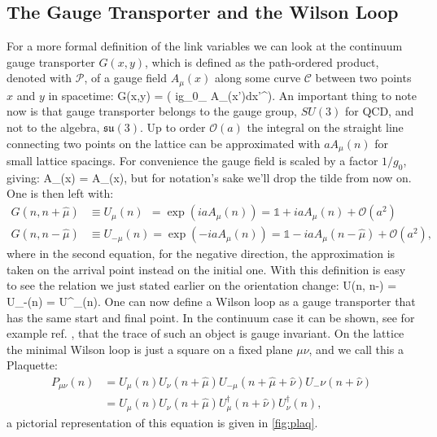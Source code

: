 \subsection{The Gauge Transporter and the Wilson Loop}
For a more formal definition of the link variables we can look at the continuum gauge transporter $G(x,y)$, which is defined as the path-ordered product, denoted with $\mathcal{P}$, of a gauge field $A_\mu(x)$ along some curve $\mathcal{C}$ between two points $x$ and $y$ in spacetime:
\beq
    G(x,y) =  \exp\left( ig_0\int_ A_\mu(x')dx'^\mu  \right).
\eeq
An important thing to note now is that gauge transporter belongs to the gauge group, $SU(3)$ for QCD, and not to the algebra, $\mathfrak{su}(3)$. 
Up to order $\mathcal{O}(a)$ the integral on the straight line connecting two points on the lattice can be approximated with $aA_\mu(n)$ for small lattice spacings. For convenience the gauge field is scaled by a factor $1/g_0$, giving: 
\beq
\tilde A_\mu(x) =  A_\mu(x),
\label{eq:fieldscale}
\eeq
but for notation's sake we'll drop the tilde from now on. One is then left with:
\begin{align}
    G(n,n+\hat\mu) &\equiv U_\mu(n) ~~= \exp(iaA_\mu(n)) = \mathds{1} + iaA_\mu(n) + \mathcal{O}(a^2) \label{eq:transporter}\\\nonumber
    G(n,n-\hat\mu) &\equiv U_{-\mu}(n) = \exp(-iaA_\mu(n)) = \mathds{1} - iaA_\mu(n-\hat\mu) + \mathcal{O}(a^2),
\end{align}
where in the second equation, for the negative direction, the approximation is taken on the arrival point instead on the initial one. With this definition is easy to see the relation we just stated earlier on the orientation change:
\beq
    U(n, n-\hat\mu) = U_{-\mu}(n) = U^\dagger_\mu(n).
\eeq
One can now define a Wilson loop as a gauge transporter that has the same start and final point. In the continuum case it can be shown, see for example ref. \cite{peskin}, that the trace of such an object is gauge invariant. On the lattice the minimal Wilson loop is just a square on a fixed plane $\mu\nu$, and we call this a Plaquette:
\begin{align}
    \label{plaquette}
P_{\mu\nu}(n) &= U_\mu(n) U_\nu(n+\hat\mu) U_{-\mu}(n+\hat\mu+\hat\nu) U_-{\nu}(n+\hat\nu)  \\\nonumber
              &= U_\mu(n) U_\nu(n+\hat\mu) U^\dagger_\mu(n+\hat\nu) U^\dagger_\nu(n),
\end{align}
a pictorial representation of this equation is given in \cref{fig:plaq}.
